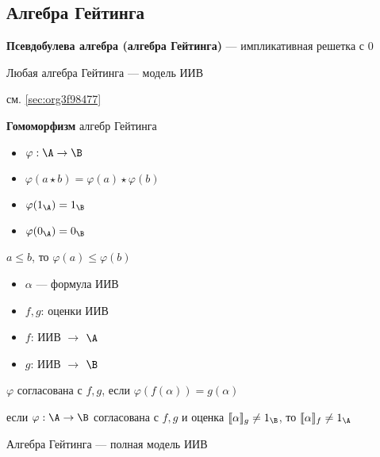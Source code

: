 \documentclass[english]{article}
\begin{document}
\subsection{Алгебра Гейтинга}
\label{sec:org6872e0a}
\begin{definition}
	\textbf{Псевдобулева алгебра (алгебра Гейтинга)} --- импликативная решетка с \(0\)
	\label{org0c2de51}
\end{definition}
\begin{theorem}
	Любая алгебра Гейтинга --- модель ИИВ
	\label{orge06a538}
\end{theorem}
\begin{examp}
	см. \ref{sec:org3f98477}
\end{examp}
\begin{definition}
	\textbf{Гомоморфизм} алгебр Гейтинга \\
	\begin{itemize}
		\item \(\varphi: \A \to \B\)
		\item \(\varphi(a \star b) = \varphi(a)\star\varphi(b)\)
		\item \(\varphi(1_\A) = 1_\B\)
		\item \(\varphi(0_\A) = 0_\B\)
	\end{itemize}
	\label{org958689d}
\end{definition}
\begin{theorem}
	\(a \le b\), то \(\varphi(a) \le \varphi(b)\)
	\label{orgea1f678}
\end{theorem}
\begin{definition}
	\-
	\begin{itemize}
		\item \(\alpha\) --- формула ИИВ
		\item \(f, g\): оценки ИИВ
		\item \(f\): ИИВ \(\to\) \(\A\)
		\item \(g\): ИИВ \(\to\) \(\B\)
	\end{itemize}
	\(\varphi\) согласована с \(f, g\), если \(\varphi(f(\alpha)) = g(\alpha)\)
	\label{org9fee5f4}
\end{definition}
\begin{theorem}
	если \(\varphi: \A \to \B\) согласована с \(f, g\) и оценка \(\llbracket \alpha \rrbracket_g \neq 1_\B\), то \(\llbracket \alpha \rrbracket_f \neq 1_\A\)
	\label{org813ee39}
\end{theorem}
\begin{theorem}
	Алгебра Гейтинга --- полная модель ИИВ
	\label{orgcb8f948}
\end{theorem}
\end{document}

